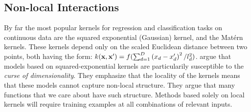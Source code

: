 \subsection{Non-local Interactions}

%
By far the most popular kernels for regression and classification tasks on continuous data are the squared exponential (Gaussian) kernel, and the Mat\'{e}rn kernels.  These kernels depend only on the scaled Euclidean distance between two points, both having the form: $ k({\bf x, x'}) = f(\sum_{d=1}^D \left( x_{d} - x_{d}' \right)^2 / l_d^2)$.
\cite{bengio2006curse} argue that models based on squared-exponential kernels are particularily susceptible to the \textit{curse of dimensionality}.  They emphasize that the locality of the kernels means that these models cannot capture non-local structure.  They argue that many functions that we care about have such structure.  Methods based solely on local kernels will require training examples at all combinations of relevant inputs.

